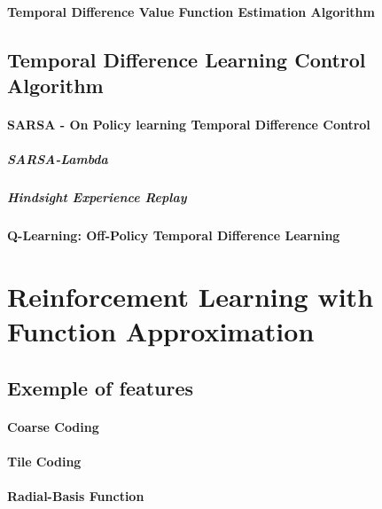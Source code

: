		\paragraph*{Temporal Difference Value Function Estimation Algorithm}

	\subsection{Temporal Difference Learning Control Algorithm} %
		\label{sub:temporal_difference_learning_control_algorithm}
		
		\paragraph*{SARSA - On Policy learning Temporal Difference Control}

			\subparagraph*{SARSA-Lambda}
			\subparagraph*{Hindsight Experience Replay}

		\paragraph*{Q-Learning: Off-Policy Temporal Difference Learning}



\section{Reinforcement Learning with Function Approximation} %
	\label{sec:reinforcement_learning_with_function_approximation}

	\subsection{Exemple of features} %
		\label{sub:exemple_of_features}

		\paragraph*{Coarse Coding}
		\paragraph*{Tile Coding}
		\paragraph*{Radial-Basis Function}
